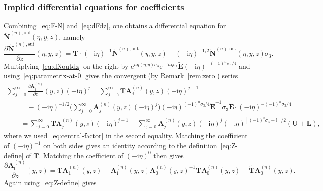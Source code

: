 \documentclass[pdftex]{sigma}
\numberwithin{equation}{section}
\begin{document}
\subsubsection{Implied differential equations for coefficients}
Combining~\eqref{eq:F-N} and~\eqref{eq:dFdz}, one obtains
 a differential equation for $\breve{\mathbf{N}}^{(n),\mathrm{out}}(\eta,y,z)$, namely
 \begin{equation}
 \frac{\partial\breve{\mathbf{N}}^{(n),\mathrm{out}}}{\partial z}(\eta,y,z)=\mathbf{T}\cdot (-\mathrm{i}\eta)^{-1}\breve{\mathbf{N}}^{(n),\mathrm{out}}(\eta,y,z) - (-\mathrm{i}\eta)^{-1/2}\breve{\mathbf{N}}^{(n),\mathrm{out}}(\eta,y,z)\sigma_3.
\label{eq:dNoutdz}
\end{equation}
Multiplying~\eqref{eq:dNoutdz} on the right by $\mathrm{e}^{ng(\eta,y)\sigma_3}\mathrm{e}^{-\mathrm{i} n\eta\sigma_3}\widetilde{\mathbf{E}}(-\mathrm{i}\eta)^{-(-1)^n\sigma_3/4}$ and using~\eqref{eq:parametrix-at-0} gives the convergent (by Remark~\ref{rem:zero}) series
\begin{gather*}
\sum_{j=0}^\infty \frac{\partial\mathbf{A}^{(n)}_j}{\partial z} (y,z)(-\mathrm{i}\eta)^j
 = \sum_{j=0}^\infty \mathbf{T}\mathbf{A}^{(n)}_j(y,z)(-\mathrm{i}\eta)^{j-1} \\
\qquad\quad{} - (-\mathrm{i}\eta)^{-1/2}\Bigg(\sum_{j=0}^{\infty}\mathbf{A}_j^{(n)}(y,z) (-\mathrm{i}\eta)^j\Bigg)(-\mathrm{i}\eta)^{(-1)^n\sigma_3/4}\widetilde{\mathbf{E}}^{-1}\sigma_3\widetilde{\mathbf{E}}\cdot(-\mathrm{i}\eta)^{-(-1)^n\sigma_3/4}\\
\qquad {} = \sum_{j=0}^\infty \mathbf{T}\mathbf{A}_j^{(n)}(y,z)(-\mathrm{i}\eta)^{j-1}-\sum_{j=0}^\infty\mathbf{A}_j^{(n)}(y,z)(-\mathrm{i}\eta)^j(-\mathrm{i}\eta)^{[(-1)^n\sigma_3-\mathbb{I}]/2}(\mathbf{U}+\mathbf{L}),
\end{gather*}
where we used~\eqref{eq:central-factor} in the second equality. Matching the coefficient of $(-\mathrm{i}\eta)^{-1}$ on both sides gives an identity according to the definition~\eqref{eq:Z-define} of $\mathbf{T}$. Matching the coefficient of $(-\mathrm{i}\eta)^0$ then gives
\begin{equation*}
\frac{\partial\mathbf{A}_0^{(n)}}{\partial z}(y,z)=\mathbf{T}\mathbf{A}_1^{(n)}(y,z)-\mathbf{A}_1^{(n)}(y,z)\mathbf{A}_0^{(n)}(y,z)^{-1}\mathbf{T}\mathbf{A}_0^{(n)}(y,z) - \widetilde{\mathbf{T}}\mathbf{A}_0^{(n)}(y,z).
\end{equation*}
Again using~\eqref{eq:Z-define} gives
\end{document}
